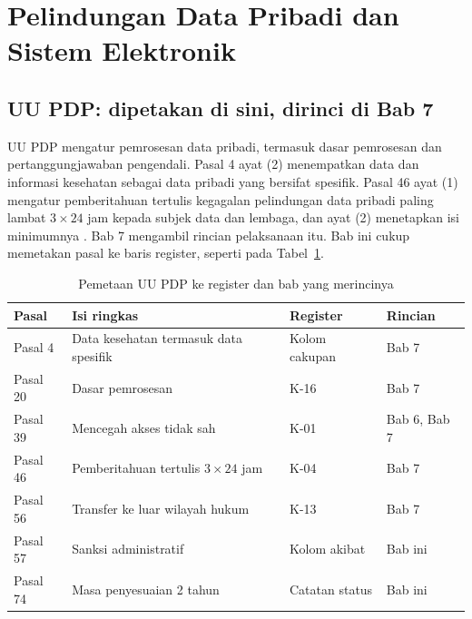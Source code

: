 \section{Pelindungan Data Pribadi dan Sistem Elektronik}

\subsection*{UU PDP: dipetakan di sini, dirinci di Bab 7}

UU PDP mengatur pemrosesan data pribadi, termasuk dasar pemrosesan dan pertanggungjawaban
pengendali. Pasal 4 ayat (2) menempatkan data dan informasi kesehatan sebagai data pribadi yang
bersifat spesifik. Pasal 46 ayat (1) mengatur pemberitahuan tertulis kegagalan pelindungan data
pribadi paling lambat $3 \times 24$ jam kepada subjek data dan lembaga, dan ayat (2) menetapkan
isi minimumnya \cite{uu27-2022-pdp}. Bab 7 mengambil rincian pelaksanaan itu. Bab ini cukup
memetakan pasal ke baris register, seperti pada Tabel~\ref{tab:ch03-peta-pdp}.

\begin{table}[!htb]
  \centering\small
  \caption{Pemetaan UU PDP ke register dan bab yang merincinya}\label{tab:ch03-peta-pdp}
  \begin{tabularx}{\textwidth}{|>{\raggedright\arraybackslash}p{}|>{\raggedright\arraybackslash}X|>{\raggedright\arraybackslash}p{}|>{\raggedright\arraybackslash}p{}|}
    \hline
    \textbf{Pasal} & \textbf{Isi ringkas} & \textbf{Register} & \textbf{Rincian} \\ \hline
    Pasal 4 & Data kesehatan termasuk data spesifik & Kolom cakupan & Bab 7 \\ \hline
    Pasal 20 & Dasar pemrosesan & K-16 & Bab 7 \\ \hline
    Pasal 39 & Mencegah akses tidak sah & K-01 & Bab 6, Bab 7 \\ \hline
    Pasal 46 & Pemberitahuan tertulis $3 \times 24$ jam & K-04 & Bab 7 \\ \hline
    Pasal 56 & Transfer ke luar wilayah hukum & K-13 & Bab 7 \\ \hline
    Pasal 57 & Sanksi administratif & Kolom akibat & Bab ini \\ \hline
    Pasal 74 & Masa penyesuaian 2 tahun & Catatan status & Bab ini \\ \hline
  \end{tabularx}
\end{table}


